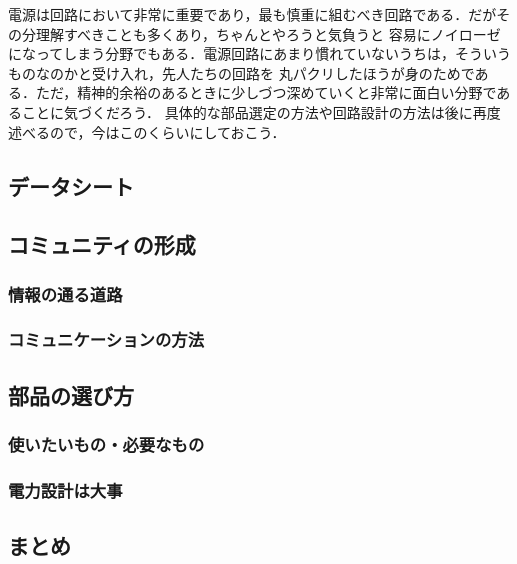 \documentclass[dvipdfmx]{jsarticle}
\begin{document}
電源は回路において非常に重要であり，最も慎重に組むべき回路である．だがその分理解すべきことも多くあり，ちゃんとやろうと気負うと
容易にノイローゼになってしまう分野でもある．電源回路にあまり慣れていないうちは，そういうものなのかと受け入れ，先人たちの回路を
丸パクリしたほうが身のためである．ただ，精神的余裕のあるときに少しづつ深めていくと非常に面白い分野であることに気づくだろう．
具体的な部品選定の方法や回路設計の方法は後に再度述べるので，今はこのくらいにしておこう．

\subsection{データシート}


\subsection{コミュニティの形成}

\subsubsection{情報の通る道路}

\subsubsection{コミュニケーションの方法}


\subsection{部品の選び方}
\label{sub:部品の選び方}

\subsubsection{使いたいもの・必要なもの}

\subsubsection{電力設計は大事}


\subsection{まとめ}

\clearpage
\end{document}
